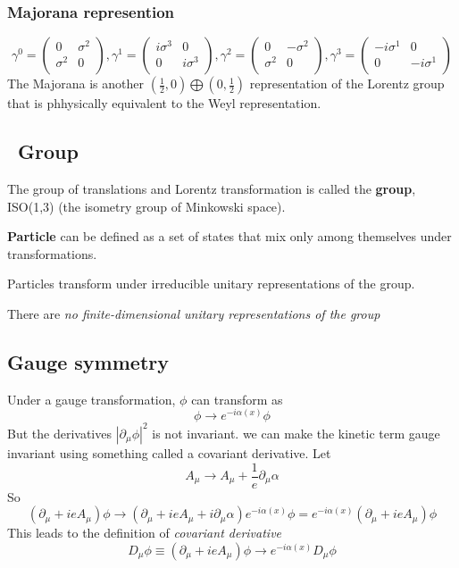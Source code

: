 \subsubsection{Majorana represention}
\begin{equation}
    \gamma^{0} = 
    \begin{pmatrix}
	0   &	\sigma^2    \\
	\sigma^2    & 0     \\
    \end{pmatrix},
    \gamma^{1} = 
    \begin{pmatrix}
	i\sigma^3    & 0     \\
	0   &	i\sigma^3    \\
    \end{pmatrix},
    \gamma^{2} = 
    \begin{pmatrix}
	0   &	-\sigma^2    \\
	\sigma^2    & 0     \\
    \end{pmatrix},
    \gamma^{3} = 
    \begin{pmatrix}
	-i\sigma^1    & 0     \\
	0   &	-i\sigma^1    \\
    \end{pmatrix}
\end{equation}
The Majorana is another $(\frac{1}{2}, 0)\bigoplus (0, \frac{1}{2})$
representation of the Lorentz group that is phhysically equivalent to the
Weyl representation.
\subsection{\Poincare \ Group} 
The group of translations and Lorentz transformation is called the
\textbf{\Poincare{} group}, 
ISO(1,3) (the isometry group of Minkowski space).

\textbf{Particle} can be defined as a set of states that mix only among
themselves under \Poincare{} transformations.

Particles transform under irreducible unitary representations of the
\Poincare{} group.

There are \emph{no finite-dimensional unitary representations of the
\Poincare{} group}

\subsection{Gauge symmetry}
Under a gauge transformation, $\phi$ can transform as 
\[
    \phi\rightarrow e^{-i\alpha(x)}\phi
    \]
But the derivatives $|\partial_\mu \phi|^2$ is not invariant. we can make
the kinetic term gauge invariant using something called a covariant
derivative. Let
\[
    A_\mu \rightarrow A_\mu + \frac{1}{e}\partial_\mu \alpha
    \]
So
\[
    (\partial_\mu+ieA_\mu)\phi\rightarrow(\partial_\mu+ieA_\mu+i\partial_\mu\alpha)e^{-i\alpha(x)}\phi=e^{-i\alpha(x)}(\partial_\mu+ieA_\mu)\phi
    \]
This leads to the definition of \emph{covariant derivative}
\[
    D_\mu\phi\equiv(\partial_\mu+ieA_\mu)\phi\rightarrow{e^{-i\alpha(x)}D_\mu\phi}
    \]
